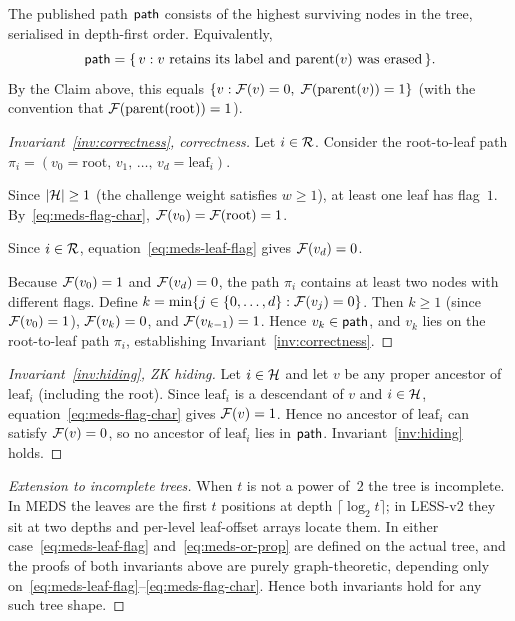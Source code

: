 The published path $\mathsf{path}$ consists of the highest surviving nodes in the
tree, serialised in depth-first order.  Equivalently,
\[
  \mathsf{path} = \{\,v : v \text{ retains its label and }
  \mathrm{parent}(v) \text{ was erased}\,\}.
\]
By the Claim above, this equals
$\{v : \mathcal{F}(v) = 0,\;\mathcal{F}(\mathrm{parent}(v)) = 1\}$
(with the convention that $\mathcal{F}(\mathrm{parent}(\mathrm{root})) = 1$).

\begin{proof}[Invariant~\ref{inv:correctness}, correctness]
Let $i \in \mathcal{R}$.  Consider the root-to-leaf path
$\pi_i = (v_0 = \mathrm{root},\,v_1,\,\ldots,\,v_d = \mathrm{leaf}_i)$.

Since $|\mathcal{H}| \geq 1$ (the challenge weight satisfies $w \geq 1$), at least
one leaf has flag~$1$.  By~\eqref{eq:meds-flag-char},
$\mathcal{F}(v_0) = \mathcal{F}(\mathrm{root}) = 1$.

Since $i \in \mathcal{R}$, equation~\eqref{eq:meds-leaf-flag} gives
$\mathcal{F}(v_d) = 0$.

Because $\mathcal{F}(v_0) = 1$ and $\mathcal{F}(v_d) = 0$, the path $\pi_i$ contains
at least two nodes with different flags.  Define
$k = \min\{j \in \{0,\ldots,d\} : \mathcal{F}(v_j) = 0\}$.
Then $k \geq 1$ (since $\mathcal{F}(v_0) = 1$), $\mathcal{F}(v_k) = 0$, and
$\mathcal{F}(v_{k-1}) = 1$.  Hence $v_k \in \mathsf{path}$, and $v_k$ lies on the
root-to-leaf path $\pi_i$, establishing Invariant~\ref{inv:correctness}.
\end{proof}

\begin{proof}[Invariant~\ref{inv:hiding}, ZK hiding]
Let $i \in \mathcal{H}$ and let $v$ be any proper ancestor of $\mathrm{leaf}_i$
(including the root).  Since $\mathrm{leaf}_i$ is a descendant of $v$ and
$i \in \mathcal{H}$, equation~\eqref{eq:meds-flag-char} gives $\mathcal{F}(v) = 1$.
Hence no ancestor of $\mathrm{leaf}_i$ can satisfy $\mathcal{F}(v) = 0$, so no
ancestor of $\mathrm{leaf}_i$ lies in $\mathsf{path}$.
Invariant~\ref{inv:hiding} holds.
\end{proof}

\begin{proof}[Extension to incomplete trees]
When $t$ is not a power of~$2$ the tree is incomplete. In MEDS the leaves
are the first $t$ positions at depth $\lceil \log_2 t \rceil$; in LESS-v2
they sit at two depths and per-level leaf-offset arrays locate them. In
either case~\eqref{eq:meds-leaf-flag} and~\eqref{eq:meds-or-prop} are
defined on the actual tree, and the proofs of both invariants above are
purely graph-theoretic, depending only
on~\eqref{eq:meds-leaf-flag}--\eqref{eq:meds-flag-char}. Hence both
invariants hold for any such tree shape.
\end{proof}

